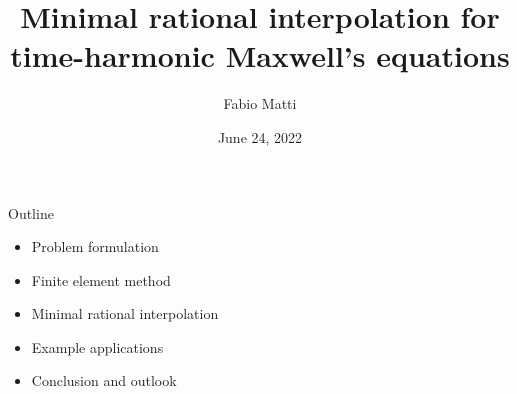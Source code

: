 \documentclass{beamer}
\title{Minimal rational interpolation for \\
       time-harmonic Maxwell's equations}
\date{June 24, 2022}
\author{Fabio Matti}
\begin{document}
\begin{frame}[noframenumbering]

    \titlepage

\end{frame}

%
%

\begin{frame}{Outline}

    \begin{itemize}
        \item Problem formulation
        \item Finite element method
        \item Minimal rational interpolation
        \item Example applications
        \item Conclusion and outlook
    \end{itemize}

\end{frame}
\end{document}
